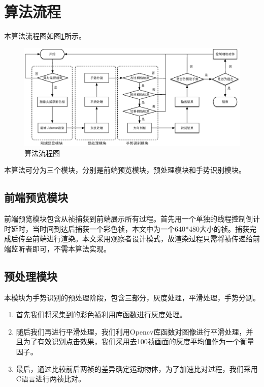 \documentclass{XDBAthesis}
\begin{document}
\section{算法流程}
本算法流程图如图\ref{fg:af}所示。
\begin{figure}[htb]
    \centering
    \includegraphics[width=\textwidth ]{figure/algorithmflow}
    \caption{算法流程图}
    \label{fg:af}
\end{figure}

本算法可分为三个模块，分别是前端预览模块，预处理模块和手势识别模块。
\subsection{前端预览模块}
前端预览模块包含从祯捕获到前端展示所有过程。首先用一个单独的线程控制倒计时延时，当时间到达后捕获一个彩色祯，本文中为一个640*480大小的祯。捕获完成后传至前端进行渲染。本文采用观察者设计模式，故渲染过程只需将祯传递给前端监听者即可，不需本算法实现。
\subsection{预处理模块}
本模块为手势识别的预处理阶段，包含三部分，灰度处理，平滑处理，手势分割。
\begin{enumerate}
    \item 首先我们将采集到的彩色祯利用库函数进行灰度处理。
    \item 随后我们再进行平滑处理，我们利用Opencv库函数对图像进行平滑处理，并且为了有效识别点击效果，我们采用去100祯画面的灰度平均值作为一个衡量因子。
    \item 最后，通过比较前后两祯的差异确定运动物体，为了加速比对过程，我们采用C语言进行两祯比对。
\end{enumerate}
\end{document}
